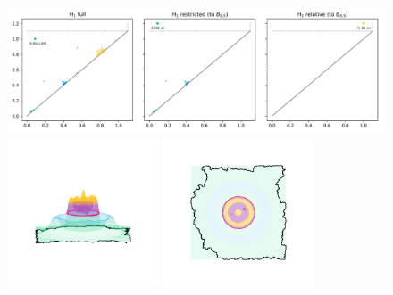 \begin{figure}[htbp]
  \centering
  \includegraphics[width=\textwidth]{scripts/figures/relative/dgm-1_0.png}
  \includegraphics[trim=500 800 500 800, clip, width=0.4\textwidth]{scripts/figures/relative/surf_side-1_0.png}
  \includegraphics[trim=500 500 500 500, clip, width=0.4\textwidth]{scripts/figures/relative/surf_top-1_0.png}
\end{figure}

